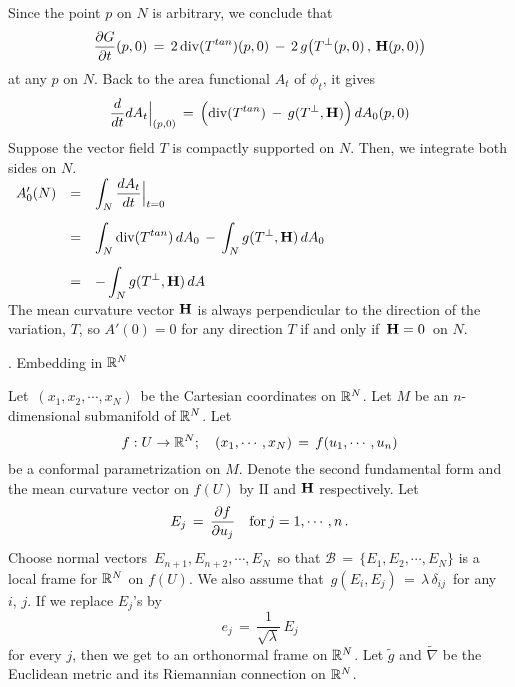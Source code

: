 \documentclass{article}[12pt,a4paper]
\begin{document}
Since the point $p$ on $N$ is arbitrary, we conclude that 
\begin{equation}
\frac{\partial G}{\partial t}(p,0) \,=\, 2\,\mbox{div}(T^{tan})(p,0) \,-\, 2\, g\big(T^\perp(p,0) \,,\, {\bf H}(p,0)\big)
\end{equation}
at any $p$ on $N$. Back to the area functional $A_t$ of $\phi_t$, it gives 
$$ \frac{d}{dt}dA_t\Big\vert_{(p,0)} \,=\, 
	\Big(\mbox{div}(T^{tan}) \,-\, g(T^\perp, {\bf H})\Big)\, dA_0(p,0)$$
Suppose the vector field $T$ is compactly supported on $N$. 
Then, we integrate both sides on $N$. \\[0.1in]
$\begin{array}{rcl}
A'_0(N) &=& \displaystyle \int_N \frac{dA_t}{dt}\Big\vert_{t=0} \\[0.2in]
&=& \displaystyle \int_N \mbox{div}(T^{tan})\, dA_0 \,-\, \int_N g(T^\perp, {\bf H})\, dA_0 \\[0.2in]
&=& \displaystyle - \int_N  g(T^\perp, {\bf H})\, dA 
\end{array} $ \\[0.2in]
The mean curvature vector ${\bf H}$ is always perpendicular to the direction of the variation, $T$,
so $A'(0)=0$ for any direction $T$ if and only if \,${\bf H}=0$\, on $N$. \\[0.2in]

\begin{center} {. Embedding in $\mathbb{R}^N$}\end{center}

Let \,$(x_1, x_2, \cdots, x_N)$\, be the Cartesian coordinates on $\mathbb{R}^N$. 
Let $M$ be an $n$-dimensional submanifold of $\mathbb{R}^N$. Let
$$  f: U\to \mathbb{R}^N; \quad (x_1, \cdots, x_N)\,=\, f(u_1,\cdots,u_n) $$ 
be a conformal parametrization on $M$. Denote the second fundamental form 
and the mean curvature vector on $f(U)$ by $\mbox{II}$ and ${\bf H}$ respectively. Let 
$$E_j \,=\, \frac{\partial f}{\partial u_j} \quad \mbox{for} \, j=1,\cdots,n\,. $$
Choose normal vectors \,$E_{n+1}, E_{n+2}, \cdots, E_N$\, so that
$\mathcal{B}\,=\, \big\{ E_1, E_2, \cdots, E_N \big\}$ is a local frame for $\mathbb{R}^N$ on $f(U)$.
We also assume that \,$g(E_i, E_j) \,=\, \lambda \, \delta_{ij}$\, for any $i,\,j$. 
If we replace $E_j$'s by $$e_j \,=\, \frac{1}{\sqrt{\lambda}}\, E_j$$
for every $j$, then we get to an orthonormal frame on $\mathbb{R}^N$.
Let $\tilde{g}$ and $\tilde{\nabla}$ be the Euclidean metric and its Riemannian connection on $\mathbb{R}^N$. \\
\end{document}
